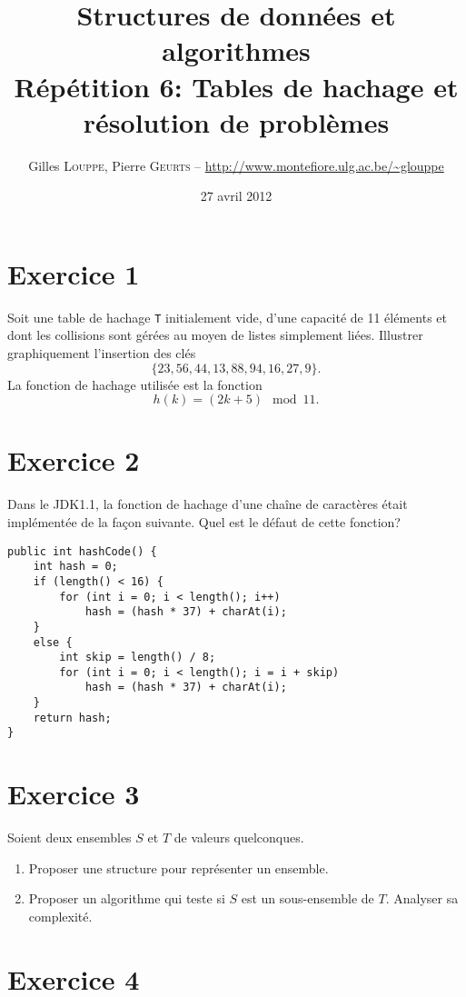 \documentclass[a4paper,10pt]{article}
\title{
    \textbf{Structures de données et algorithmes}\\
    Répétition 6: Tables de hachage et résolution de problèmes
}
\author{Gilles \textsc{Louppe}, Pierre \textsc{Geurts} -- \url{http://www.montefiore.ulg.ac.be/~glouppe}}
\date{27 avril 2012}
\begin{document}
\maketitle

\section*{Exercice 1}

Soit une table de hachage \texttt{T} initialement vide, d'une capacité de 11 éléments et dont les collisions sont gérées au moyen de listes simplement liées. Illustrer graphiquement l'insertion des clés $$\{23, 56, 44, 13, 88, 94, 16, 27, 9\}.$$ La fonction de hachage utilisée est la fonction $$h(k) = (2k + 5) \mod 11.$$

\section*{Exercice 2}

Dans le JDK1.1, la fonction de hachage d'une chaîne de caractères était implémentée de la façon suivante. Quel est le défaut de cette fonction?

\begin{verbatim}
public int hashCode() {
    int hash = 0;
    if (length() < 16) {
        for (int i = 0; i < length(); i++)
            hash = (hash * 37) + charAt(i);
    }
    else {
        int skip = length() / 8;
        for (int i = 0; i < length(); i = i + skip)
            hash = (hash * 37) + charAt(i);
    }
    return hash;
}
\end{verbatim}

\section*{Exercice 3}

Soient deux ensembles $S$ et $T$ de valeurs quelconques.

\begin{enumerate}
\item Proposer une structure pour représenter un ensemble.
\item Proposer un algorithme qui teste si $S$ est un sous-ensemble de $T$. Analyser sa complexité.
\end{enumerate}

\section*{Exercice 4}
\end{document}
